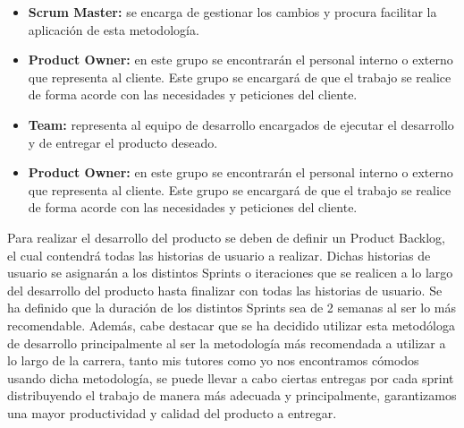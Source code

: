 \begin{itemize}

	\item \textbf{Scrum Master:} se encarga de gestionar los cambios y procura facilitar la aplicación de esta metodología.
	
	\item \textbf{Product Owner:} en este grupo se encontrarán el personal interno o externo que representa al cliente. Este grupo se encargará de que el trabajo se realice de forma acorde con las necesidades y peticiones del cliente.
	
	\item \textbf{Team:} representa al equipo de desarrollo encargados de ejecutar el desarrollo y de entregar el producto deseado.
	
	\item \textbf{Product Owner:} en este grupo se encontrarán el personal interno o externo que representa al cliente. Este grupo se encargará de que el trabajo se realice de forma acorde con las necesidades y peticiones del cliente.	

\end{itemize}
\cite{wiki:scrum}
 
Para realizar el desarrollo del producto se deben de definir un Product Backlog, el cual contendrá todas las historias de usuario a realizar. Dichas historias de usuario se asignarán a los distintos Sprints o iteraciones que se realicen a lo largo del desarrollo del producto hasta finalizar con todas las historias de usuario. Se ha definido que la duración de los distintos Sprints sea de 2 semanas al ser lo más recomendable.
Además, cabe destacar que se ha decidido utilizar esta metodóloga de desarrollo principalmente al ser la metodología más recomendada a utilizar a lo largo de la carrera, tanto mis tutores como yo nos encontramos cómodos usando dicha metodología, se puede llevar a cabo ciertas entregas por cada sprint distribuyendo el trabajo de manera más adecuada y principalmente, garantizamos una mayor productividad y calidad del producto a entregar. 










